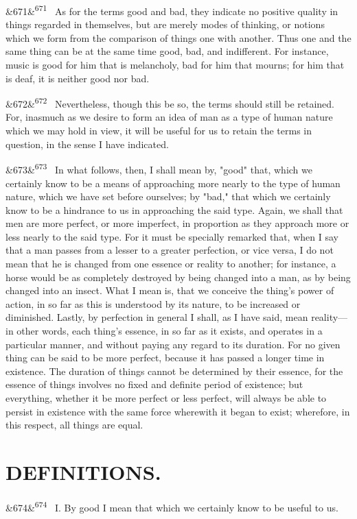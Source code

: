 \documentclass[12pt]{article}
\newcommand{\para}[1][]{\par\noindent\ifx&#1&\else\textsuperscript{\footnotesize #1}~\fi}
\begin{document}
\para[671] As for the terms good and bad, they indicate no positive quality in things regarded in themselves, but are merely modes of thinking, or notions which we form from the comparison of things one with another. Thus one and the same thing can be at the same time good, bad, and indifferent. For instance, music is good for him that is melancholy, bad for him that mourns; for him that is deaf, it is neither good nor bad.

\para[672] Nevertheless, though this be so, the terms should still be retained. For, inasmuch as we desire to form an idea of man as a type of human nature which we may hold in view, it will be useful for us to retain the terms in question, in the sense I have indicated.

\para[673] In what follows, then, I shall mean by, "good" that, which we certainly know to be a means of approaching more nearly to the type of human nature, which we have set before ourselves; by "bad," that which we certainly know to be a hindrance to us in approaching the said type. Again, we shall that men are more perfect, or more imperfect, in proportion as they approach more or less nearly to the said type. For it must be specially remarked that, when I say that a man passes from a lesser to a greater perfection, or vice versa, I do not mean that he is changed from one essence or reality to another; for instance, a horse would be as completely destroyed by being changed into a man, as by being changed into an insect. What I mean is, that we conceive the thing's power of action, in so far as this is understood by its nature, to be increased or diminished. Lastly, by perfection in general I shall, as I have said, mean reality---in other words, each thing's essence, in so far as it exists, and operates in a particular manner, and without paying any regard to its duration. For no given thing can be said to be more perfect, because it has passed a longer time in existence. The duration of things cannot be determined by their essence, for the essence of things involves no fixed and definite period of existence; but everything, whether it be more perfect or less perfect, will always be able to persist in existence with the same force wherewith it began to exist; wherefore, in this respect, all things are equal.

\section*{DEFINITIONS.}

\para[674] I. By good I mean that which we certainly know to be useful to us.
\end{document}
